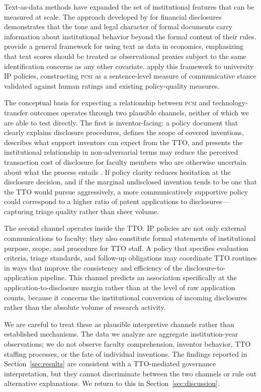 \documentclass[12pt]{article}
\newcommand{\PCSI}{\textsc{pcsi}}
\begin{document}
Text-as-data methods have expanded the set of institutional features that can be measured
at scale. The approach developed by \citet{loughranmcdonald2011} for financial disclosures
demonstrates that the tone and legal character of formal documents carry information about
institutional behavior beyond the formal content of their rules. \citet{gentzkowkellytaddy2019}
provide a general framework for using text as data in economics, emphasizing that text
scores should be treated as observational proxies subject to the same identification
concerns as any other covariate. \citet{sharma2026pcsi} apply this framework to
university IP policies, constructing \PCSI{} as a sentence-level measure of communicative
stance validated against human ratings and existing policy-quality measures.

The conceptual basis for expecting a relationship between \PCSI{} and
technology-transfer outcomes operates through two plausible channels, neither of which
we are able to test directly. The first is inventor-facing: a policy document that
clearly explains disclosure procedures, defines the scope of covered inventions, describes
what support inventors can expect from the TTO, and presents the institutional relationship
in non-adversarial terms may reduce the perceived transaction cost of disclosure for
faculty members who are otherwise uncertain about what the process entails
\citep{jensenthursby2001, thursbythursby2002}. If policy clarity reduces hesitation at
the disclosure decision, and if the marginal undisclosed invention tends to be one that
the TTO would pursue aggressively, a more communicatively supportive policy could
correspond to a higher ratio of patent applications to disclosures---capturing triage
quality rather than sheer volume.

The second channel operates inside the TTO. IP policies are not only external communications
to faculty; they also constitute formal statements of institutional purpose, scope, and
procedure for TTO staff. A policy that specifies evaluation criteria, triage standards,
and follow-up obligations may coordinate TTO routines in ways that improve the
consistency and efficiency of the disclosure-to-application pipeline. This channel
predicts an association specifically at the application-to-disclosure margin rather than
at the level of raw application counts, because it concerns the institutional conversion
of incoming disclosures rather than the absolute volume of research activity.

We are careful to treat these as plausible interpretive channels rather than established
mechanisms. The data we analyze are aggregate institution-year observations; we do not
observe faculty comprehension, inventor behavior, TTO staffing processes, or the fate
of individual inventions. The findings reported in Section~\ref{sec:results} are
consistent with a TTO-mediated governance interpretation, but they cannot discriminate
between the two channels or rule out alternative explanations. We return to this in
Section~\ref{sec:discussion}.
\end{document}
